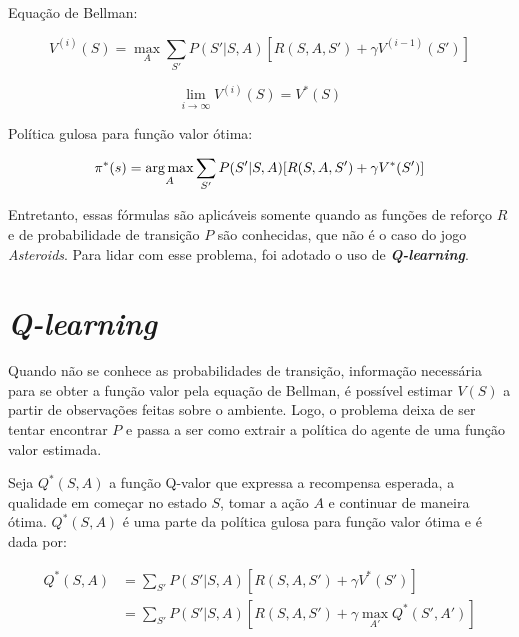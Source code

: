 Equação de Bellman:

\begin{equation} \label{eq:bellman}
V^{(i)}(S) = \max_{A}\sum_{S'}P(S'|S,A)[R(S,A,S') + \gamma V^{(i-1)}(S')]
\end{equation}

\begin{equation} \label{eq:qvalue}
\lim_{i\to\infty} V^{(i)}(S) = V^{*}(S)
\end{equation}

Política gulosa para função valor ótima:

\begin{equation} \label{eq:opt_pol}
\pi^{*}(s) = \operatorname*{arg\,max}_{A}\sum_{S'}P(S'|S,A)[R(S,A,S') + \gamma V^{*}(S')]
\end{equation}

Entretanto, essas fórmulas são aplicáveis somente quando as funções de reforço $R$ e de probabilidade de transição $P$ são conhecidas, que não é o caso do jogo \textit{Asteroids}.
Para lidar com esse problema, foi adotado o uso de \textit{\textbf{Q-learning}}.


\section{\textit{Q-learning}}
\label{sec:ql}

Quando não se conhece as probabilidades de transição, informação necessária para se obter a função valor pela equação de Bellman, é possível estimar $V(S)$ a partir de observações feitas sobre o ambiente.
Logo, o problema deixa de ser tentar encontrar $P$ e passa a ser como extrair a política do agente de uma função valor estimada.

Seja $Q^{*}(S,A)$ a função Q-valor que expressa a recompensa esperada, a qualidade em começar no estado $S$, tomar a ação $A$ e continuar de maneira ótima. $Q^{*}(S,A)$ é uma parte da política gulosa para função valor ótima e é dada por:

\begin{equation} \label{eq:qfunction}
\begin{align*}
Q^{*}(S,A) &= \sum_{S'}P(S'|S,A)[R(S,A,S') + \gamma V^{*}(S')] \\
        &= \sum_{S'}P(S'|S,A)[R(S,A,S') + \gamma \max_{A'}Q^{*}(S',A')]
\end{align*}
\end{equation}

